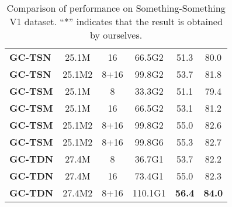 \begin{table}[t]
\begin{tabular}{l|c|c|c|cc}
\textbf{GC-TSN} &25.1M  &16 &66.5G2  &51.3 &80.0  \\
\textbf{GC-TSN} &25.1M2  &8+16 &99.8G2  &53.7 &81.8 \\
            \hline


\textbf{GC-TSM} &25.1M  &8 &33.3G2 &51.1 &79.4  \\




\textbf{GC-TSM} &25.1M  &16 &66.5G2  &53.1 &81.2  \\


            \textbf{GC-TSM} &25.1M2  &8+16 &99.8G2  &55.0 &82.6  \\
            \textbf{GC-TSM} &25.1M2  &8+16 &99.8G6  &55.3 &82.7  \\
            \hline
            \textbf{GC-TDN} &27.4M  &8 &36.7G1 &53.7 &82.2  \\
            \textbf{GC-TDN} &27.4M  &16 &73.4G1 &55.0 &82.3  \\
            \textbf{GC-TDN} &27.4M2  &8+16 &110.1G1 &\textbf{56.4} &\textbf{84.0} \\
\hline
		\end{tabular}
		\vspace{-0.3cm}
		\caption{Comparison of performance on Something-Something V1 dataset. ``*'' indicates that the result is obtained by ourselves.}
		\label{tab:res_somev1}
		\vspace{-0.5cm}
\end{table}

